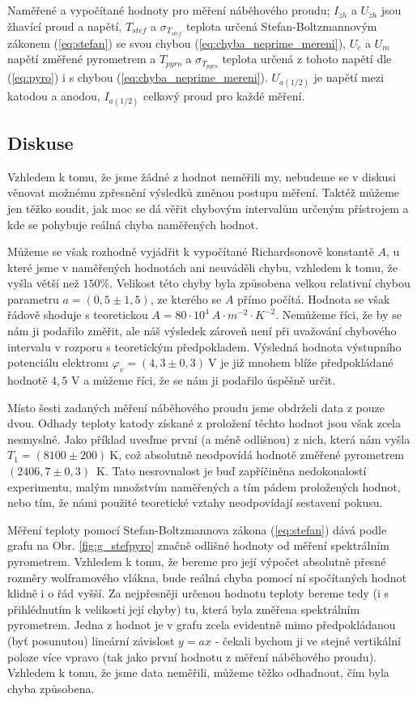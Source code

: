 \documentclass[english]{article}
\begin{document}
\begin{table}[htbp]
  \caption{
Naměřené a vypočítané hodnoty pro měření náběhového proudu;
    $I_{\check{z}h}$ a $U_{\check{z}h}$ jsou žhavící proud a napětí,
    $T_{stef}$ a $\sigma_{T_{stef}}$ teplota určená Stefan-Boltzmannovým zákonem (\ref{eq:stefan}) se svou chybou (\ref{eq:chyba_neprime_mereni}), 
    $U_{\check{c}}$ a $U_{m}$ napětí změřené pyrometrem a
    $T_{pyro}$ a $\sigma_{T_{pyro}}$ teplota určená z tohoto napětí dle (\ref{eq:pyro}) i s chybou (\ref{eq:chyba_neprime_mereni}). $U_{a(1/2)}$ je napětí mezi katodou a anodou, $I_{a(1/2)}$ celkový proud pro každé měření.	
  }
  \label{tab:nabeh}%
\end{table}%
 						
	\subsection{Diskuse}
		Vzhledem k tomu, že jsme žádné z hodnot neměřili my, nebudeme se v diskusi věnovat možnému zpřesnění výsledků změnou postupu měření. Taktéž můžeme jen těžko soudit, jak moc se dá věřit chybovým intervalům určeným přístrojem a kde se pohybuje reálná chyba naměřených hodnot. 
		
		Můžeme se však rozhodně vyjádřit k vypočítané Richardsonově konstantě $A$, u které jsme v naměřených hodnotách ani neuváděli chybu, vzhledem k tomu, že vyšla větší než $150\%$. Velikost této chyby byla způsobena velkou relativní chybou parametru $a=(0,5\pm1,5)$, ze kterého se $A$ přímo počítá. Hodnota se však řádově shoduje s teoretickou $A=80\cdot 10^4~A\cdot m^{-2} \cdot K^{-2}$. Nemůžeme říci, že by se nám ji podařilo změřit, ale náš výsledek zároveň není při uvažování chybového intervalu v rozporu s teoretickým předpokladem. Výsledná hodnota výstupního potenciálu elektronu $\varphi_v = (4,3\pm0,3)~\mathrm{V}$ je již mnohem blíže předpokládané hodnotě $4,5$ V a můžeme říci, že se nám ji podařilo úspěšně určit.
		
		Místo šesti zadaných měření náběhového proudu jsme obdrželi data z pouze dvou. Odhady teploty katody získané z proložení těchto hodnot jsou však zcela nesmyslné. Jako příklad uveďme první (a méně odlišnou) z nich, která nám vyšla $T_1 = (8100\pm200)~\mathrm{K}$, což absolutně neodpovídá hodnotě změřené pyrometrem $(2406,7\pm0,3)$~K. Tato nesrovnalost je buď zapříčiněna nedokonalostí experimentu, malým množstvím naměřených a tím pádem proložených hodnot, nebo tím, že námi použité teoretické vztahy neodpovídají sestavení pokusu.
		
		Měření teploty pomocí Stefan-Boltzmannova zákona (\ref{eq:stefan}) dává podle grafu na Obr. \ref{fig:g_stefpyro} značně odlišné hodnoty od měření spektrálním pyrometrem. Vzhledem k tomu, že bereme pro její výpočet absolutně přesné rozměry wolframového vlákna, bude reálná chyba pomocí ní spočítaných hodnot klidně i o řád vyšší. Za nejpřesněji určenou hodnotu teploty bereme tedy (i s přihlédnutím k velikosti její chyby) tu, která byla změřena spektrálním pyrometrem. Jedna z hodnot je v grafu zcela evidentně mimo předpokládanou (byť posunutou) lineární závislost $y=ax$ - čekali bychom ji ve stejné vertikální poloze více vpravo (tak jako první hodnotu z měření náběhového proudu). Vzhledem k tomu, že jsme data neměřili, můžeme těžko odhadnout, čím byla chyba způsobena.
	
\end{document}
